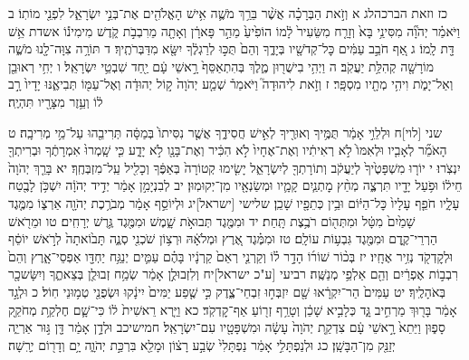 \documentclass[twoside, openany, parskip=half, 11pt]{book}
\begin{document}
כז וזאת הברכהלג א וְזֹ֣את הַבְּרָכָ֗ה אֲשֶׁ֨ר בֵּרַ֥ךְ מֹשֶׁ֛ה אִ֥ישׁ הָאֱלֹהִ֖ים אֶת־בְּנֵ֣י יִשְׂרָאֵ֑ל לִפְנֵ֖י מוֹתֽוֹ׃ ב וַיֹּאמַ֗ר יְהֹוָ֞ה מִסִּינַ֥י בָּא֙ וְזָרַ֤ח מִשֵּׂעִיר֙ לָ֔מוֹ הוֹפִ֙יעַ֙ מֵהַ֣ר פָּארָ֔ן וְאָתָ֖ה מֵרִבְבֹ֣ת קֹ֑דֶשׁ מִימִינ֕וֹ אשדת אֵ֥שׁ דָּ֖ת לָֽמוֹ׃ ג אַ֚ף חֹבֵ֣ב עַמִּ֔ים כׇּל־קְדֹשָׁ֖יו בְּיָדֶ֑ךָ וְהֵם֙ תֻּכּ֣וּ לְרַגְלֶ֔ךָ יִשָּׂ֖א מִדַּבְּרֹתֶֽיךָ׃ ד תּוֹרָ֥ה צִוָּה־לָ֖נוּ מֹשֶׁ֑ה מוֹרָשָׁ֖ה קְהִלַּ֥ת יַעֲקֹֽב׃ ה וַיְהִ֥י בִישֻׁר֖וּן מֶ֑לֶךְ בְּהִתְאַסֵּף֙ רָ֣אשֵׁי עָ֔ם יַ֖חַד שִׁבְטֵ֥י יִשְׂרָאֵֽל׃ ו יְחִ֥י רְאוּבֵ֖ן וְאַל־יָמֹ֑ת וִיהִ֥י מְתָ֖יו מִסְפָּֽר׃
ז וְזֹ֣את לִיהוּדָה֮ וַיֹּאמַר֒ שְׁמַ֤ע יְהֹוָה֙ ק֣וֹל יְהוּדָ֔ה וְאֶל־עַמּ֖וֹ תְּבִיאֶ֑נּוּ יָדָיו֙ רָ֣ב ל֔וֹ וְעֵ֥זֶר מִצָּרָ֖יו תִּהְיֶֽה׃

שני [לוי]ח וּלְלֵוִ֣י אָמַ֔ר תֻּמֶּ֥יךָ וְאוּרֶ֖יךָ לְאִ֣ישׁ חֲסִידֶ֑ךָ אֲשֶׁ֤ר נִסִּיתוֹ֙ בְּמַסָּ֔ה תְּרִיבֵ֖הוּ עַל־מֵ֥י מְרִיבָֽה׃ ט הָאֹמֵ֞ר לְאָבִ֤יו וּלְאִמּוֹ֙ לֹ֣א רְאִיתִ֔יו וְאֶת־אֶחָיו֙ לֹ֣א הִכִּ֔יר וְאֶת־בָּנָ֖ו לֹ֣א יָדָ֑ע כִּ֤י שָֽׁמְרוּ֙ אִמְרָתֶ֔ךָ וּבְרִיתְךָ֖ יִנְצֹֽרוּ׃ י יוֹר֤וּ מִשְׁפָּטֶ֙יךָ֙ לְיַעֲקֹ֔ב וְתוֹרָתְךָ֖ לְיִשְׂרָאֵ֑ל יָשִׂ֤ימוּ קְטוֹרָה֙ בְּאַפֶּ֔ךָ וְכָלִ֖יל עַֽל־מִזְבְּחֶֽךָ׃ יא בָּרֵ֤ךְ יְהֹוָה֙ חֵיל֔וֹ וּפֹ֥עַל יָדָ֖יו תִּרְצֶ֑ה מְחַ֨ץ מׇתְנַ֧יִם קָמָ֛יו וּמְשַׂנְאָ֖יו מִן־יְקוּמֽוּן׃
יב לְבִנְיָמִ֣ן אָמַ֔ר יְדִ֣יד יְהֹוָ֔ה יִשְׁכֹּ֥ן לָבֶ֖טַח עָלָ֑יו חֹפֵ֤ף עָלָיו֙ כׇּל־הַיּ֔וֹם וּבֵ֥ין כְּתֵפָ֖יו שָׁכֵֽן׃
שלישי [ישראל]יג וּלְיוֹסֵ֣ף אָמַ֔ר מְבֹרֶ֥כֶת יְהֹוָ֖ה אַרְצ֑וֹ מִמֶּ֤גֶד שָׁמַ֙יִם֙ מִטָּ֔ל וּמִתְּה֖וֹם רֹבֶ֥צֶת תָּֽחַת׃ יד וּמִמֶּ֖גֶד תְּבוּאֹ֣ת שָׁ֑מֶשׁ וּמִמֶּ֖גֶד גֶּ֥רֶשׁ יְרָחִֽים׃ טו וּמֵרֹ֖אשׁ הַרְרֵי־קֶ֑דֶם וּמִמֶּ֖גֶד גִּבְע֥וֹת עוֹלָֽם׃ טז וּמִמֶּ֗גֶד אֶ֚רֶץ וּמְלֹאָ֔הּ וּרְצ֥וֹן שֹׁכְנִ֖י סְנֶ֑ה תָּב֙וֹאתָה֙ לְרֹ֣אשׁ יוֹסֵ֔ף וּלְקׇדְקֹ֖ד נְזִ֥יר אֶחָֽיו׃ יז בְּכ֨וֹר שׁוֹר֜וֹ הָדָ֣ר ל֗וֹ וְקַרְנֵ֤י רְאֵם֙ קַרְנָ֔יו בָּהֶ֗ם עַמִּ֛ים יְנַגַּ֥ח יַחְדָּ֖ו אַפְסֵי־אָ֑רֶץ וְהֵם֙ רִבְב֣וֹת אֶפְרַ֔יִם וְהֵ֖ם אַלְפֵ֥י מְנַשֶּֽׁה׃
רביעי [ע"כ ישראל]יח וְלִזְבוּלֻ֣ן אָמַ֔ר שְׂמַ֥ח זְבוּלֻ֖ן בְּצֵאתֶ֑ךָ וְיִשָּׂשכָ֖ר בְּאֹהָלֶֽיךָ׃ יט עַמִּים֙ הַר־יִקְרָ֔אוּ שָׁ֖ם יִזְבְּח֣וּ זִבְחֵי־צֶ֑דֶק כִּ֣י שֶׁ֤פַע יַמִּים֙ יִינָ֔קוּ וּשְׂפֻנֵ֖י טְמ֥וּנֵי חֽוֹל׃
כ וּלְגָ֣ד אָמַ֔ר בָּר֖וּךְ מַרְחִ֣יב גָּ֑ד כְּלָבִ֣יא שָׁכֵ֔ן וְטָרַ֥ף זְר֖וֹעַ אַף־קׇדְקֹֽד׃ כא וַיַּ֤רְא רֵאשִׁית֙ ל֔וֹ כִּי־שָׁ֛ם חֶלְקַ֥ת מְחֹקֵ֖ק סָפ֑וּן וַיֵּתֵא֙ רָ֣אשֵׁי עָ֔ם צִדְקַ֤ת יְהֹוָה֙ עָשָׂ֔ה וּמִשְׁפָּטָ֖יו עִם־יִשְׂרָאֵֽל׃
חמישיכב וּלְדָ֣ן אָמַ֔ר דָּ֖ן גּ֣וּר אַרְיֵ֑ה יְזַנֵּ֖ק מִן־הַבָּשָֽׁן׃ כג וּלְנַפְתָּלִ֣י אָמַ֔ר נַפְתָּלִי֙ שְׂבַ֣ע רָצ֔וֹן וּמָלֵ֖א בִּרְכַּ֣ת יְהֹוָ֑ה יָ֥ם וְדָר֖וֹם יְרָֽשָׁה׃
\end{document}
